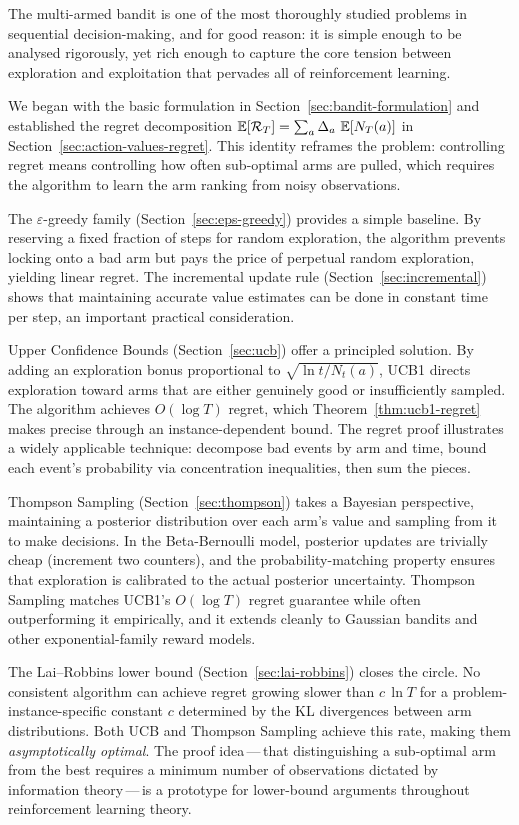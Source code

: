 The multi-armed bandit is one of the most thoroughly studied problems in sequential decision-making, and for good reason: it is simple enough to be analysed rigorously, yet rich enough to capture the core tension between exploration and exploitation that pervades all of reinforcement learning.

We began with the basic formulation in Section~\ref{sec:bandit-formulation} and established the regret decomposition $\operatorname{\mathbb{E}}[\mathcal{R}_T]=\sum_a\Delta_a\,\operatorname{\mathbb{E}}[N_T(a)]$ in Section~\ref{sec:action-values-regret}.  This identity reframes the problem: controlling regret means controlling how often sub-optimal arms are pulled, which requires the algorithm to learn the arm ranking from noisy observations.

The $\varepsilon$-greedy family (Section~\ref{sec:eps-greedy}) provides a simple baseline.  By reserving a fixed fraction of steps for random exploration, the algorithm prevents locking onto a bad arm but pays the price of perpetual random exploration, yielding linear regret.  The incremental update rule (Section~\ref{sec:incremental}) shows that maintaining accurate value estimates can be done in constant time per step, an important practical consideration.

Upper Confidence Bounds (Section~\ref{sec:ucb}) offer a principled solution.  By adding an exploration bonus proportional to $\sqrt{\ln t / N_t(a)}$, UCB1 directs exploration toward arms that are either genuinely good or insufficiently sampled.  The algorithm achieves $O(\log T)$ regret, which Theorem~\ref{thm:ucb1-regret} makes precise through an instance-dependent bound.  The regret proof illustrates a widely applicable technique: decompose bad events by arm and time, bound each event's probability via concentration inequalities, then sum the pieces.

Thompson Sampling (Section~\ref{sec:thompson}) takes a Bayesian perspective, maintaining a posterior distribution over each arm's value and sampling from it to make decisions.  In the Beta-Bernoulli model, posterior updates are trivially cheap (increment two counters), and the probability-matching property ensures that exploration is calibrated to the actual posterior uncertainty.  Thompson Sampling matches UCB1's $O(\log T)$ regret guarantee while often outperforming it empirically, and it extends cleanly to Gaussian bandits and other exponential-family reward models.

The Lai--Robbins lower bound (Section~\ref{sec:lai-robbins}) closes the circle.  No consistent algorithm can achieve regret growing slower than $c\,\ln T$ for a problem-instance-specific constant $c$ determined by the KL divergences between arm distributions.  Both UCB and Thompson Sampling achieve this rate, making them \emph{asymptotically optimal}.  The proof idea\,---\,that distinguishing a sub-optimal arm from the best requires a minimum number of observations dictated by information theory\,---\,is a prototype for lower-bound arguments throughout reinforcement learning theory.

